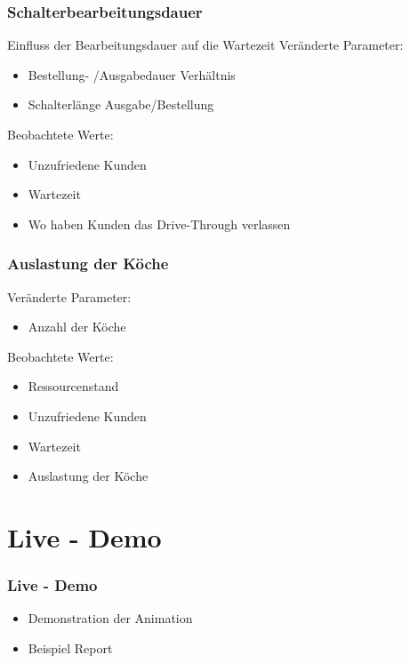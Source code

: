 \documentclass{beamer}
\begin{document}
\begin{frame} %
  \frametitle{Schalterbearbeitungsdauer} %
  Einfluss der Bearbeitungsdauer auf die Wartezeit\newline
  Veränderte Parameter:
  \begin{itemize}
  	\item Bestellung- /Ausgabedauer Verhältnis
  	\item Schalterlänge Ausgabe/Bestellung
  \end{itemize}
  Beobachtete Werte: %
  \begin{itemize}
  	\item Unzufriedene Kunden %
  	\item Wartezeit %
  	\item Wo haben Kunden das Drive-Through verlassen
  \end{itemize}
\end{frame}

\begin{frame} %
  \frametitle{Auslastung der Köche} %
	Veränderte Parameter:
  \begin{itemize}
  	\item Anzahl der Köche   	
  \end{itemize}
  
  Beobachtete Werte:
  \begin{itemize}
  	\item Ressourcenstand
  	\item Unzufriedene Kunden 
  	\item Wartezeit
  	\item Auslastung der Köche %
  \end{itemize}
\end{frame}

\section{Live - Demo}
\begin{frame} %
  \frametitle{Live - Demo } %
  \begin{itemize}
  	\item Demonstration der Animation
  	\item Beispiel Report
  \end{itemize}
\end{frame}
\end{document}
